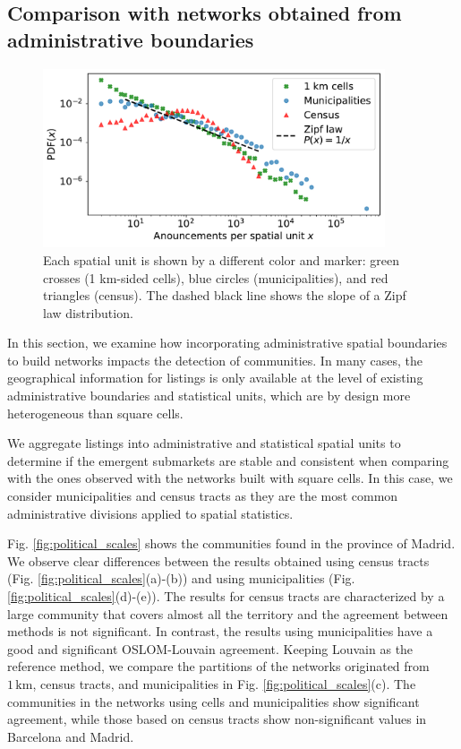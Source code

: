 \subsection{Comparison with networks obtained from administrative boundaries}\label{sec:political spatial units}

\begin{figure}
    \label{fig:distribution_announcements}
    \centering
    \includegraphics[width = 0.9\textwidth]{Figs/Idealista_segmentation/Distribution_adds_census_cell.pdf}
	\caption[Distribution of listings for different spatial units.]{ Each spatial unit is shown by a different color and marker: green crosses (1 km-sided cells), blue circles (municipalities), and red triangles (census). The dashed black line shows the slope of a Zipf law distribution.}
\end{figure}

In this section, we examine how incorporating administrative spatial boundaries to build networks impacts the detection of communities. In many cases, the geographical information for listings is only available at the level of existing administrative boundaries and statistical units, which are by design more heterogeneous than square cells.

We aggregate listings into administrative and statistical spatial units to determine if the emergent submarkets are stable and consistent when comparing with the ones observed with the networks built with square cells. In this case, we consider municipalities and census tracts as they are the most common administrative divisions applied to spatial statistics. 

Fig. \ref{fig:political_scales} shows the communities found in the province of Madrid. We observe clear differences between the results obtained using census tracts (Fig. \ref{fig:political_scales}(a)-(b)) and using municipalities (Fig. \ref{fig:political_scales}(d)-(e)). The results for census tracts are characterized by a large community that covers almost all the territory and the agreement between methods is not significant. In contrast, the results using municipalities have a good and significant OSLOM-Louvain agreement. Keeping Louvain as the reference method, we compare the partitions of the networks originated from $1  \, \textrm{km}$, census tracts, and municipalities in Fig. \ref{fig:political_scales}(c). The communities in the networks using cells and municipalities show significant agreement, while those based on census tracts show non-significant values in Barcelona and Madrid.


